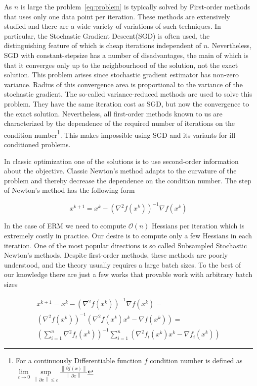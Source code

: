 \documentclass{article}
\begin{document}
As $n$ is large the problem~\eqref{eq:problem} is typically solved by First-order methods that uses only one data point per iteration. These methods are extensively studied and there are a wide variety of variations of such techniques. In particular, the Stochastic Gradient Descent(SGD) is often used, the distinguishing feature of which is cheap iterations independent of $n$. Nevertheless, SGD with constant-stepsize has a number of disadvantages, the main of which is that it converges only up to the neighbourhood of the solution, not the exact solution. This problem arises since stochastic gradient estimator has non-zero variance. Radius of this convergence area is proportional to the variance of the stochastic gradient. The so-called variance-reduced methods \cite{svrg, saga} are used to solve this problem. They have the same iteration cost as SGD, but now the convergence to the exact solution. Nevertheless, all first-order methods known to us are characterized by the dependence of the required number of iterations on the condition number\footnote{For a continuously Differentiable function $f$ condition number is defined as $\lim\limits_{\varepsilon \rightarrow 0} \sup\limits_{\left\|\partial x\right\| \leq \varepsilon} \frac{\left\|\partial f\left(x\right)\right\|}{\left\|\partial x\right\|}$}. This makes impossible using SGD and its variants for ill-conditioned problems.

In classic optimization one of the solutions is to use second-order information about the objective. Classic Newton's method adapts to the curvature of the problem and thereby decrease the dependence on the condition number. The step of Newton's method has the following form

\begin{equation}
    x^{k+1} = x^k - \left(\nabla^2f\left(x^k\right)\right)^{-1}\nabla f\left(x^k\right)
\end{equation}

In the case of ERM we need to compute $\mathcal{O}(n)$ Hessians per iteration which is extremely costly in practice. Our desire is to compute only a few Hessians in each iteration. One of the most popular directions is so called Subsampled Stochastic Newton's methods. Despite first-order methods, these methods are poorly understood, and the theory usually requires a large batch sizes. To the best of our knowledge there are just a few works that provable work with arbitrary batch sizes \cite{litlink3, litlink5} 

\begin{equation}
\begin{multlined}
    x^{k+1} = x^k - \left(\nabla^2f\left(x^k\right)\right)^{-1}\nabla f\left(x^k\right) = \\
    \left(\nabla^2f\left(x^k\right)\right)^{-1}\left(\nabla^2f\left(x^k\right)x^k - \nabla f\left(x^k\right)\right) = \\
    \left(\sum\limits_{i=1}^n\nabla^2f_i\left(x^k\right)\right)^{-1}\sum\limits_{i=1}^n \left(\nabla^2f_i\left(x^k\right)x^k - \nabla f_i\left(x^k\right)\right)
\end{multlined}
\end{equation}
\end{document}
